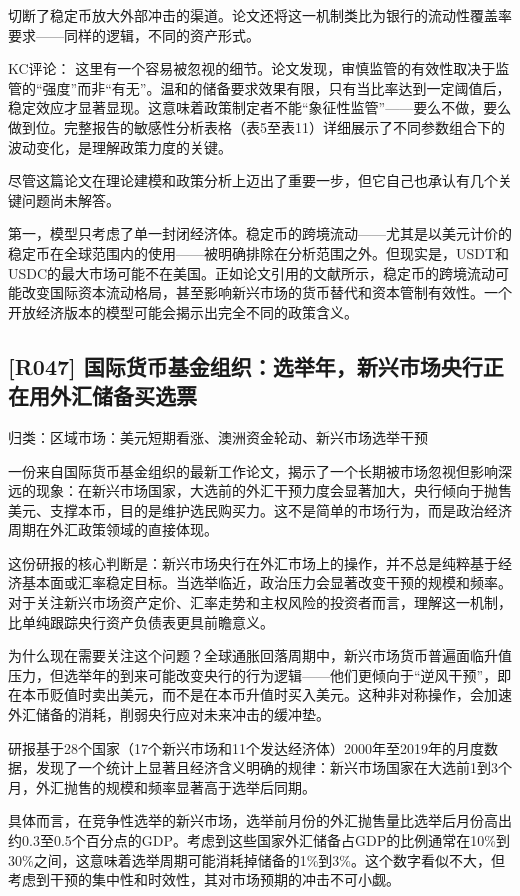 \documentclass[11pt]{ctexart}
\begin{document}
切断了稳定币放大外部冲击的渠道。论文还将这一机制类比为银行的流动性覆盖率要求——同样的逻辑，不同的资产形式。

KC评论： 这里有一个容易被忽视的细节。论文发现，审慎监管的有效性取决于监管的“强度”而非“有无”。温和的储备要求效果有限，只有当比率达到一定阈值后，稳定效应才显著显现。这意味着政策制定者不能“象征性监管”——要么不做，要么做到位。完整报告的敏感性分析表格（表5至表11）详细展示了不同参数组合下的波动变化，是理解政策力度的关键。

尽管这篇论文在理论建模和政策分析上迈出了重要一步，但它自己也承认有几个关键问题尚未解答。

第一，模型只考虑了单一封闭经济体。稳定币的跨境流动——尤其是以美元计价的稳定币在全球范围内的使用——被明确排除在分析范围之外。但现实是，USDT和USDC的最大市场可能不在美国。正如论文引用的文献所示，稳定币的跨境流动可能改变国际资本流动格局，甚至影响新兴市场的货币替代和资本管制有效性。一个开放经济版本的模型可能会揭示出完全不同的政策含义。

\subsection{[R047] 国际货币基金组织：选举年，新兴市场央行正在用外汇储备买选票}
{\small\color{refgray}归类：区域市场：美元短期看涨、澳洲资金轮动、新兴市场选举干预}

一份来自国际货币基金组织的最新工作论文，揭示了一个长期被市场忽视但影响深远的现象：在新兴市场国家，大选前的外汇干预力度会显著加大，央行倾向于抛售美元、支撑本币，目的是维护选民购买力。这不是简单的市场行为，而是政治经济周期在外汇政策领域的直接体现。

这份研报的核心判断是：新兴市场央行在外汇市场上的操作，并不总是纯粹基于经济基本面或汇率稳定目标。当选举临近，政治压力会显著改变干预的规模和频率。对于关注新兴市场资产定价、汇率走势和主权风险的投资者而言，理解这一机制，比单纯跟踪央行资产负债表更具前瞻意义。

为什么现在需要关注这个问题？全球通胀回落周期中，新兴市场货币普遍面临升值压力，但选举年的到来可能改变央行的行为逻辑——他们更倾向于“逆风干预”，即在本币贬值时卖出美元，而不是在本币升值时买入美元。这种非对称操作，会加速外汇储备的消耗，削弱央行应对未来冲击的缓冲垫。

研报基于28个国家（17个新兴市场和11个发达经济体）2000年至2019年的月度数据，发现了一个统计上显著且经济含义明确的规律：新兴市场国家在大选前1到3个月，外汇抛售的规模和频率显著高于选举后同期。

具体而言，在竞争性选举的新兴市场，选举前月份的外汇抛售量比选举后月份高出约0.3至0.5个百分点的GDP。考虑到这些国家外汇储备占GDP的比例通常在10\%到30\%之间，这意味着选举周期可能消耗掉储备的1\%到3\%。这个数字看似不大，但考虑到干预的集中性和时效性，其对市场预期的冲击不可小觑。
\end{document}
